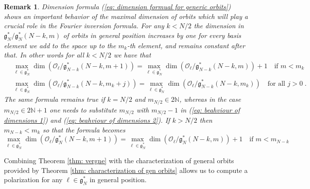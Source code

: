 \documentclass[pdflatex,sn-mathphys-num]{sn-jnl}
\theoremstyle{thmstyletwo}
\theoremstyle{thmstyleone}
\theoremstyle{thmstyletwo}
\newtheorem{remark}[definition]{Remark}
\newcommand{\fancyg}{\mathfrak{g}}
\begin{document}
	\begin{remark}\label{rem: general dimensions jump}
		Dimension formula (\ref{eq: dimension formual for generic orbits}) shows an important behavior of the maximal dimension of orbits which will play a crucial role in the Fourier inversion formula. For any $k<N/2$ the dimension in $\fancyg_{N}^*/\fancyg_{N}^*(N-k,m)$ of orbits in general position increases by one for every basis element we add to the space up to the $m_k$-th element, and remains constant after that. In other words for all $k<N/2$ we have that
		\begin{align}
			&\max_{\ell \in \fancyg_{N}^*}\operatorname{dim}\left(\mathcal{O}_{\ell}/\fancyg_{N-k}^*(N-k,m+1)\right) = \max_{\ell \in \fancyg_{N}^*}\operatorname{dim}\left(\mathcal{O}_{\ell}/\fancyg_{N-k}^*(N-k,m)\right) +1 \quad \text{if } m<m_k \label{eq: beahviour of dimensions 1}\\
			&\max_{\ell \in \fancyg_{N}^*}\operatorname{dim}\left(\mathcal{O}_{\ell}/\fancyg_{N-k}^*(N-k,m_k+j)\right) = \max_{\ell \in \fancyg_{N}^*}\operatorname{dim}\left(\mathcal{O}_{\ell}/\fancyg_{N-k}^*(N-k,m_k)\right) \quad \text{for all } j>0 \;.\label{eq: beahviour of dimensions 2}
		\end{align}
		The same formula remains true if $k = N/2$ and $m_{N/2} \in 2\mathbb{N}$, whereas in the case $m_{N/2} \in 2\mathbb{N}+1$ one needs to substitute $m_{N/2}$ with $m_{N/2}-1$ in (\ref{eq: beahviour of dimensions 1}) and (\ref{eq: beahviour of dimensions 2}). If $k>N/2$ then $m_{N-k}<m_k$ so that the formula becomes
		\[\max_{\ell \in \fancyg_{N}^*}\operatorname{dim}\left(\mathcal{O}_{\ell}/\fancyg_{N}^*(N-k,m+1)\right) = \max_{\ell \in \fancyg_{N}^*}\operatorname{dim}\left(\mathcal{O}_{\ell}/\fancyg_{N}^*(N-k,m)\right) +1 \quad \text{if } m<m_{N-k}\]
	\end{remark}
	Combining Theorem \ref{thm: vergne} with the characterization of general orbits provided by Theorem \ref{thm: characterization of gen orbits} allows us to compute a polarization for any $\ell \in \fancyg_N^*$ in general position.
\end{document}
